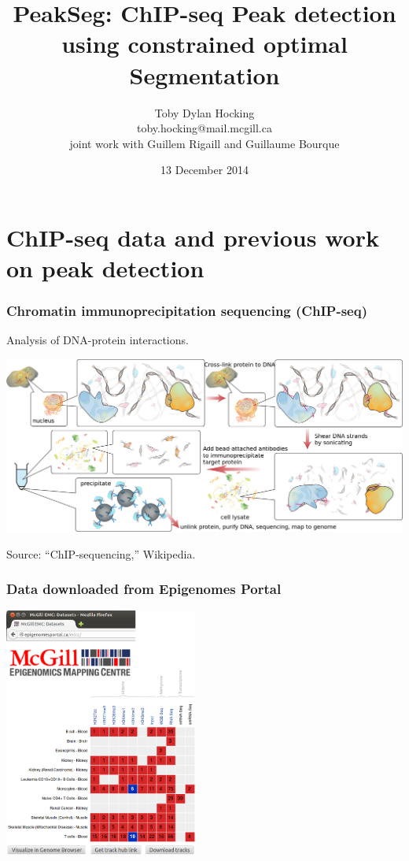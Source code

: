 \documentclass{beamer}
\begin{document}
\title{PeakSeg: ChIP-seq \textbf{Peak} detection using constrained
  optimal \textbf{Seg}mentation} 

\author{
  Toby Dylan Hocking\\
  toby.hocking@mail.mcgill.ca\\
  joint work with Guillem Rigaill and Guillaume Bourque}

\date{13 December 2014}

\maketitle

\section{ChIP-seq data and previous work on peak detection}


\begin{frame}
  \frametitle{Chromatin immunoprecipitation sequencing (ChIP-seq)}
  Analysis of DNA-protein interactions.

  \includegraphics[width=\textwidth]{Chromatin_immunoprecipitation_sequencing_wide.png}

  Source: ``ChIP-sequencing,'' Wikipedia.
\end{frame}

\begin{frame}
  \frametitle{Data downloaded from Epigenomes Portal}
  \includegraphics[width=2.5in]{screenshot-samples}
\end{frame}
\end{document}
